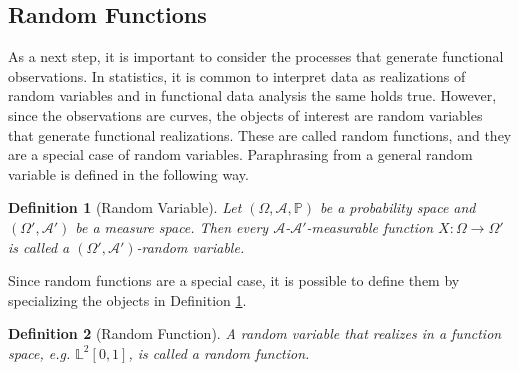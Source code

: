 \documentclass[12pt, a4paper]{article}
\theoremstyle{MAstyle} \newtheorem{assumption}{Assumption}[section]
\theoremstyle{MAstyle} \newtheorem{definition}{Definition}[section]
\theoremstyle{MAstyle} \newtheorem{theorem}{Theorem}[section]
\begin{document}
		\subsection{Random Functions}
			As a next step, it is important to consider the processes that generate functional observations. In statistics, it is common to interpret data as realizations of random variables and in functional data analysis the same holds true. However, since the observations are curves, the objects of interest are random variables that generate functional realizations. These are called random functions, and they are a special case of random variables. Paraphrasing from \cite{bauer_probability_2011} a general random variable is defined in the following way.
			\begin{definition}[Random Variable]\label{rand_var}
				Let $\left(\Omega, \mathcal{A}, \mathbb{P}\right)$ be a probability space and $\left(\Omega', \mathcal{A}'\right)$ be a measure space. Then every $\mathcal{A}$-$\mathcal{A}'$-measurable function $X:\Omega \rightarrow \Omega'$ is called a $\left(\Omega', \mathcal{A}'\right)$-random variable.
			\end{definition}
			Since random functions are a special case, it is possible to define them by specializing the objects in Definition \ref{rand_var}.
			\begin{definition}[Random Function]
				A random variable that realizes in a function space, e.g. $\mathbb{L}^2[0,1]$, is called a random function.
			\end{definition}
		
\end{document}
